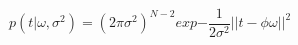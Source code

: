 \documentclass[a4paper,13pt]{article}
\theoremstyle{mytheor}
\begin{document}
\[p(t|\omega, \sigma^2) = (2\pi\sigma^2)^{N-2} exp{- \frac{1}{2\sigma^2}||t -\phi\omega||^2}  \]
\end{document}
